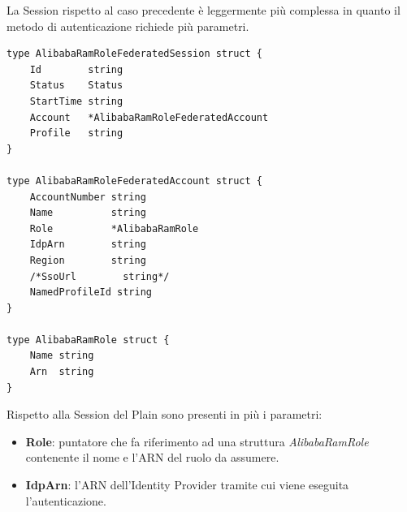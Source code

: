 \documentclass[a4paper]{article}
\begin{document}
La Session rispetto al caso precedente è leggermente più complessa in quanto il metodo di autenticazione richiede più parametri.
\begin{lstlisting}[style=customgo, caption=alibaba\_ram\_role\_federated\_session.go (righe 14-35), captionpos=b, firstnumber=14]
type AlibabaRamRoleFederatedSession struct {
	Id        string
	Status    Status
	StartTime string
	Account   *AlibabaRamRoleFederatedAccount
	Profile   string
}

type AlibabaRamRoleFederatedAccount struct {
	AccountNumber string
	Name          string
	Role          *AlibabaRamRole
	IdpArn        string
	Region        string
	/*SsoUrl        string*/
	NamedProfileId string
}

type AlibabaRamRole struct {
	Name string
	Arn  string
}
\end{lstlisting}
Rispetto alla Session del Plain sono presenti in più i parametri:
\begin{itemize}
    \item \textbf{Role}: puntatore che fa riferimento ad una struttura \textit{AlibabaRamRole} contenente il nome e l'ARN del ruolo da assumere.
    \item \textbf{IdpArn}: l'ARN dell'Identity Provider tramite cui viene eseguita l'autenticazione.
\end{itemize}
\end{document}
